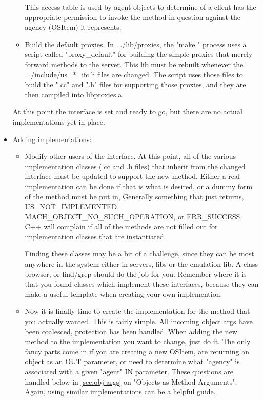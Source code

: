 \begin{itemize}
\begin{itemize}
This access table is used by agent objects to determine of a client has
the appropriate permission to invoke the method in question against the agency
(OSItem) it represents.

\item Build the default proxies.  In .../lib/proxies, the "make " process
uses a script called "proxy\_default" for building the simple proxies that
merely forward methods to the server.  This lib must be rebuilt whenever
the .../include/us\_*\_ifc.h files are changed.  The script uses those files
to build the ".cc" and ".h" files for supporting those proxies, and they
are then compiled into libproxies.a.
\end{itemize}

At this point the interface is set and ready to go, but there are no actual
implementations yet in place.

\item Adding implementations:
\begin{itemize}
\item Modify other users of the interface.  At this point,  all of the
various implementation classes (.cc and .h files) that inherit from the
changed interface must
be updated to support the new method. Either a real implementation can
be done if that is what is desired, or a dummy form of the method must
be put in,  Generally something that just returns, 
US\_NOT\_IMPLEMENTED, MACH\_OBJECT\_NO\_SUCH\_OPERATION, or ERR\_SUCCESS.
C++ will complain if all of the methods are not filled out
for implementation classes that are instantiated.

Finding these classes may be a bit of a challenge, since they can be most
anywhere in the system either in servers, libs or the emulation lib.
A class browser, or find/grep should do the job
for you.  Remember where it is that you found classes which implement
these interfaces, because they can make a useful template when creating
your own implemention.

\item Now it is finally time to create the implementation for the
method that you actually wanted.  This is fairly simple.  All incoming
object args have been coalesced, protection has been handled.  
When adding the
new method to the implementation you want to change,  just do it.  The
only fancy parts come in if you are creating a new OSItem, are returning
an object as an OUT parameter, or need to determine what "agency" is associated
with a given "agent" IN parameter.  These questions are handled below in
{\SECREF} \ref{sec:obj-args} on
"Objects as Method Arguments".  Again, using similar
implementations can be a helpful guide.


\end{itemize}
\end{itemize}
